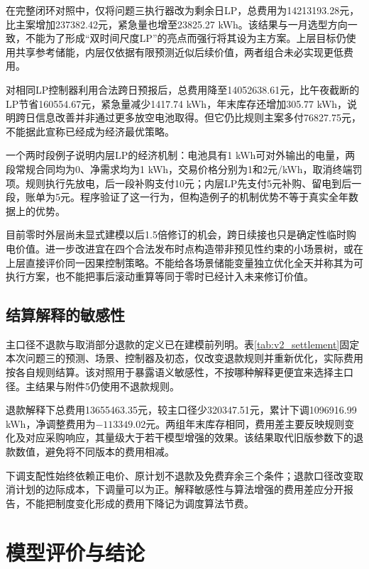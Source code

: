 

在完整闭环对照中，仅将问题三执行器改为剩余日LP，总费用为14213193.28元，比主案增加237382.42元，紧急量也增至23825.27 kWh。该结果与一月选型方向一致，不能为了形成“双时间尺度LP”的亮点而强行将其设为主方案。上层目标仍使用共享参考储能，内层仅依据有限预测近似后续价值，两者组合未必实现更低费用。

对相同LP控制器利用合法跨日预报后，总费用降至14052638.61元，比午夜截断的LP节省160554.67元，紧急量减少1417.74 kWh，年末库存还增加305.77 kWh，说明跨日信息改善并非通过更多放空电池取得。但它仍比规则主案多付76827.75元，不能据此宣称已经成为经济最优策略。

一个两时段例子说明内层LP的经济机制：电池具有1 kWh可对外输出的电量，两段常规合同均为0、净需求均为1 kWh，交易价格分别为1和2元/kWh，取消终端罚项。规则执行先放电，后一段补购支付10元；内层LP先支付5元补购、留电到后一段，账单为5元。程序验证了这一行为，但构造例子的机制优势不等于真实全年数据上的优势。

目前零时外层尚未显式建模以后1.5倍修订的机会，跨日续接也只是确定性临时购电价值。进一步改进宜在四个合法发布时点构造带非预见性约束的小场景树，或在上层直接评价同一因果控制策略。不能给各场景储能变量独立优化全天并称其为可执行方案，也不能把事后滚动重算等同于零时已经计入未来修订价值。

\subsection{结算解释的敏感性}

主口径不退款与取消部分退款的定义已在建模前列明。表\ref{tab:v2_settlement}固定本次问题三的预测、场景、控制器及初态，仅改变退款规则并重新优化，实际费用按各自规则结算。该对照用于暴露语义敏感性，不按哪种解释更便宜来选择主口径。主结果与附件5仍使用不退款规则。



退款解释下总费用13655463.35元，较主口径少320347.51元，累计下调1096916.99 kWh，净调整费用为$-113349.02$元。两组年末库存相同，费用差主要反映规则变化及对应采购响应，其量级大于若干模型增强的效果。该结果取代旧版参数下的退款数值，避免将不同版本的费用相减。

下调支配性始终依赖正电价、原计划不退款及免费弃余三个条件；退款口径改变取消计划的边际成本，下调量可以为正。解释敏感性与算法增强的费用差应分开报告，不能把制度变化形成的费用下降记为调度算法节费。

\section{模型评价与结论}

